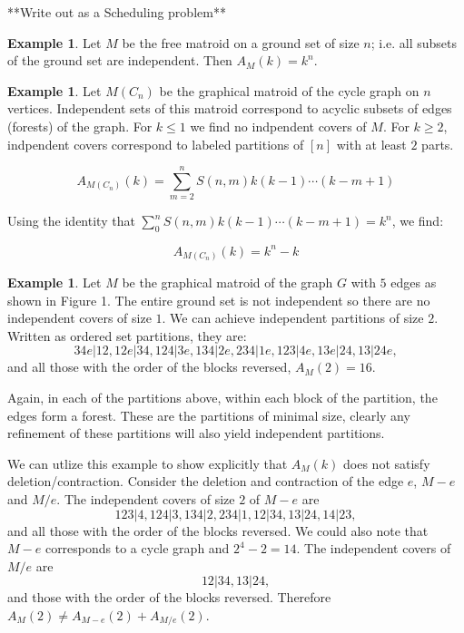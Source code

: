 \documentclass[12pt,reqno]{amsart}
\numberwithin{definition}{section}
\theoremstyle{definition}
\newtheorem{example}[definition]{Example}
\begin{document}
**Write out as a  Scheduling problem**

\begin{example}

Let $M$ be the free matroid on a ground set of size $n$; i.e. all subsets of the ground set are independent.  Then $A_M(k) = k^n$.  

\end{example}

\begin{example}

Let $M(C_n)$ be the graphical matroid of the cycle graph on $n$
vertices.  Independent sets of this matroid correspond to acyclic
subsets of edges (forests) of the graph.  For $k \leq 1$ we find no
indpendent covers of $M$.  For $k \geq 2$, indpendent covers
correspond to labeled partitions of $[n]$ with at least $2$ parts.

$$A_{M(C_n)}(k) = \sum_{m=2}^{n} S(n,m) k(k-1) \cdots (k-m+1) $$

Using the identity that $\sum_0^n S(n,m) k(k-1) \cdots (k-m+1) = k^n$, we find:

$$A_{M(C_n)}(k) = k^n - k $$

\end{example}



\begin{example}
Let $M$ be the graphical matroid of the graph $G$ with $5$ edges as
shown in Figure 1.  The entire ground set is not independent so there
are no independent covers of size $1$.  We can achieve independent
partitions of size $2$.  Written as ordered set partitions, they are:
$$ 34e|12, 12e|34, 124|3e, 134|2e, 234|1e, 123|4e, 13e|24, 13|24e, $$
and all those with the order of the blocks reversed, $A_M(2) = 16$.  

Again, in each of the partitions above, within each block of the
partition, the edges form a forest.  These are the partitions of
minimal size, clearly any refinement of these partitions will also
yield independent partitions.

\end{example}

We can utlize this example to show explicitly that $A_M(k)$ does not
satisfy deletion/contraction.  Consider the deletion and contraction
of the edge $e$, $M-e$ and $M/e$.  The independent covers of size $2$
of $M-e$ are
$$ 123|4, 124|3, 134|2, 234|1, 12|34, 13|24, 14|23, $$ and all those
with the order of the blocks reversed.  We could also note that $M-e$
corresponds to a cycle graph and $2^4 - 2 = 14$.  The independent
covers of $M/e$ are $$12|34, 13|24,$$ and those with the order of the
blocks reversed.  Therefore $A_M(2) \neq A_{M-e}(2) + A_{M/e}(2)$.
\end{document}
